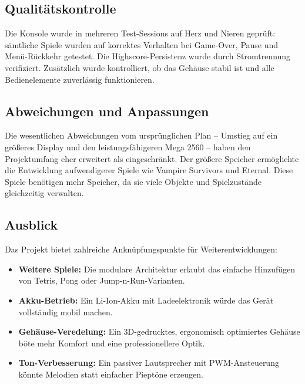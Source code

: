\documentclass[12pt,a4paper]{article}
\begin{document}
\subsection{Qualitätskontrolle}

Die Konsole wurde in mehreren Test-Sessions auf Herz und Nieren geprüft:
sämtliche Spiele wurden auf korrektes Verhalten bei Game-Over, Pause und
Menü-Rückkehr getestet. Die Highscore-Persistenz wurde durch Stromtrennung
verifiziert. Zusätzlich wurde kontrolliert, ob das Gehäuse stabil ist und alle Bedienelemente zuverlässig funktionieren.

\subsection{Abweichungen und Anpassungen}

Die wesentlichen Abweichungen vom ursprünglichen Plan – Umstieg auf ein
größeres Display und den leistungsfähigeren Mega 2560 – haben den Projektumfang
eher erweitert als eingeschränkt. Der größere Speicher ermöglichte die Entwicklung aufwendigerer Spiele wie Vampire Survivors und Eternal. Diese Spiele benötigen mehr Speicher, da sie viele Objekte und Spielzustände gleichzeitig verwalten.

\subsection{Ausblick}

Das Projekt bietet zahlreiche Anknüpfungspunkte für Weiterentwicklungen:
\begin{itemize}[noitemsep]
    \item \textbf{Weitere Spiele:} Die modulare Architektur erlaubt das einfache
          Hinzufügen von Tetris, Pong oder Jump-\textquotesingle{}n\textquotesingle{}-Run-Varianten.
    \item \textbf{Akku-Betrieb:} Ein Li-Ion-Akku mit Ladeelektronik würde das
          Gerät vollständig mobil machen.
    \item \textbf{Gehäuse-Veredelung:} Ein 3D-gedrucktes, ergonomisch optimiertes
          Gehäuse böte mehr Komfort und eine professionellere Optik.
    \item \textbf{Ton-Verbesserung:} Ein passiver Lautsprecher mit PWM-Ansteuerung
          könnte Melodien statt einfacher Pieptöne erzeugen.
\end{itemize}

\end{document}
